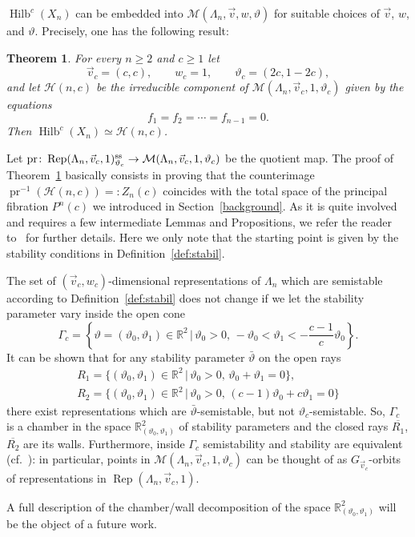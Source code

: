 \documentclass[pdftex]{sigma}
\numberwithin{equation}{section}
\newtheorem{Theorem}{Theorem}[section]
\begin{document}
$\operatorname{Hilb}^c (X_n)$ can be embedded into $\mathcal{M} (\Lambda_n,\vec{v},w, \vartheta)$
for suitable choices of $\vec{v}$, $w$, and $\vartheta$. Precisely, one has the following result:
\begin{Theorem}\label{thm45}
For every $n\geq 2$ and $c\geq 1$ let
\[\vec{v}_c=(c,c) ,\qquad w_c = 1 ,\qquad \vartheta_c = (2c, 1-2c ),\]
and let
$\mathcal{H} (n,c) $ be the irreducible component of $\mathcal{M}(\Lambda_n,\vec{v}_c, 1, \vartheta_c) $
given by the equations
\begin{equation}\label{sliceeqs}
f_1 = f_2 = \cdots = f_{n-1} =0 .
\end{equation}
Then $\operatorname{Hilb}^c (X_n)\simeq \mathcal{H} (n,c) $.
\end{Theorem}
Let $\mbox{pr}\colon \operatorname{Rep}(\Lambda_n, \vec{v}_c, 1)^{\rm ss}_{\vartheta_c} \to \mathcal{M} (\Lambda_n,\vec{v}_c,1, \vartheta_c) $
be the quotient map. The proof {of Theorem~\ref{thm45} basically consists in proving that the counterimage
$\operatorname{pr}^{-1}(\mathcal{H} (n,c) )=:Z_n(c)$ coincides with the total space of the principal fibration $P^n(c)$ we introduced in Section~\ref{background}. As it is quite involved and requires a few intermediate Lemmas and Propositions, we refer the reader to~\cite{bblr} for further details.} Here we only note that the starting point is given by the stability conditions in Definition~\ref{def:stabil}.

\begin{Remark}The set of $(\vec{v}_c,w_c)$-dimensional representations of $\Lambda_n$ which are semistable according to Definition~\ref{def:stabil} does not change if we let the stability parameter vary inside the open cone
\[
 \Gamma_c=\left\{\vartheta=(\vartheta_0,\vartheta_1)\in\mathbb{R}^2\,|\,\vartheta_0>0,\, -\vartheta_0<\vartheta_1<-\frac{c-1}{c}\vartheta_0\right\} .
\]
It can be shown that
for any stability parameter $\bar{\vartheta}$ on the open rays
\begin{gather*}
 R_1 = \big\{(\vartheta_0,\vartheta_1)\in\mathbb{R}^2\,|\,\vartheta_0>0 ,\, \vartheta_0+\vartheta_1=0\big\} ,\\
 R_2 = \big\{(\vartheta_0,\vartheta_1)\in\mathbb{R}^2\,|\,\vartheta_0>0 ,\, (c-1)\vartheta_0+c\vartheta_1=0\big\}
\end{gather*}
there exist representations which are $\bar{\vartheta}$-semistable, but not $\vartheta_c$-semistable.
So, $ \Gamma_c$ is a chamber in the space
$\mathbb{R}^2_{(\vartheta_0,\vartheta_1)}$ of stability parameters and the closed rays $\overline{R_1}$, $\overline{R_2}$ are its walls. Furthermore, inside $\Gamma_c$ semistability and stability are equivalent (cf.~\cite[Lemma~4.7]{bblr}): in particular, points in $\mathcal{M} (\Lambda_n,\vec{v}_c,1, \vartheta_c)$ can be thought of as
$G_{\vec{v}_c}$-orbits of representations in $\operatorname{Rep}(\Lambda_n, \vec{v}_c, 1)$.

A full description of the chamber/wall decomposition of the space $\mathbb{R}^2_{(\vartheta_0,\vartheta_1)}$ will be the object of a future work.
\end{Remark}
\end{document}
